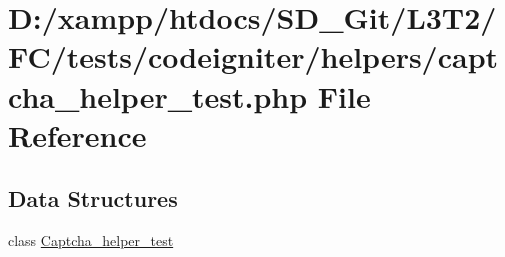 \hypertarget{captcha__helper__test_8php}{}\section{D\+:/xampp/htdocs/\+S\+D\+\_\+\+Git/\+L3\+T2/\+F\+C/tests/codeigniter/helpers/captcha\+\_\+helper\+\_\+test.php File Reference}
\label{captcha__helper__test_8php}
\subsection*{Data Structures}
\begin{DoxyCompactItemize}
\item 
class \hyperlink{class_captcha__helper__test}{Captcha\+\_\+helper\+\_\+test}
\end{DoxyCompactItemize}
